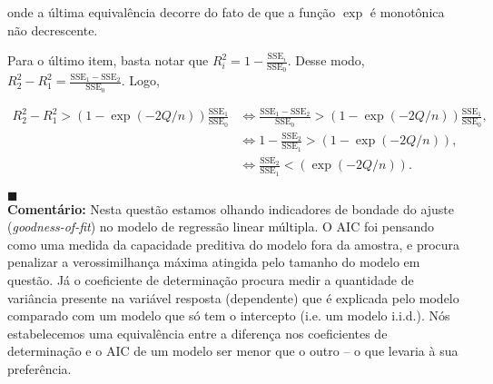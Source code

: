 {{onde a última equivalência decorre do fato de que a função $\exp$ é monotônica não decrescente.

Para o último item, basta notar que $R_i^2 = 1 - \frac{\text{SSE}_i}{\text{SSE}_0}$. Desse modo, $R_2^2 - R_1^2 = \frac{\text{SSE}_1 - \text{SSE}_2}{\text{SSE}_0}$. Logo,

\begin{align*}
    R_2^2 - R_1^2 > \left(1 - \exp\left(-2Q/n\right)\right) \frac{\text{SSE}_1}{\text{SSE}_0} &\iff \frac{\text{SSE}_1 - \text{SSE}_2}{\text{SSE}_0} > \left(1 - \exp\left(-2Q/n\right)\right) \frac{\text{SSE}_1}{\text{SSE}_0}, \\
    &\iff 1 - \frac{\text{SSE}_2}{\text{SSE}_1} > \left(1 - \exp\left(-2Q/n\right)\right), \\
    &\iff \frac{\text{SSE}_2}{\text{SSE}_1} < \left(\exp\left(-2Q/n\right)\right).
\end{align*}

$\blacksquare$\\
\textbf{Comentário:} Nesta questão estamos olhando indicadores de bondade do ajuste (\textit{goodness-of-fit}) no  modelo de regressão linear múltipla.
O AIC foi pensando como uma medida da capacidade preditiva do modelo fora da amostra, e procura penalizar a verossimilhança máxima atingida pelo tamanho do modelo em questão. 
Já o coeficiente de determinação procura medir a quantidade de variância presente na variável resposta (dependente) que é explicada pelo modelo comparado com um modelo que só tem o intercepto (i.e. um modelo i.i.d.).
Nós estabelecemos uma equivalência entre a diferença nos coeficientes de determinação e o AIC de um modelo ser menor que o outro -- o que levaria à sua preferência.
}}